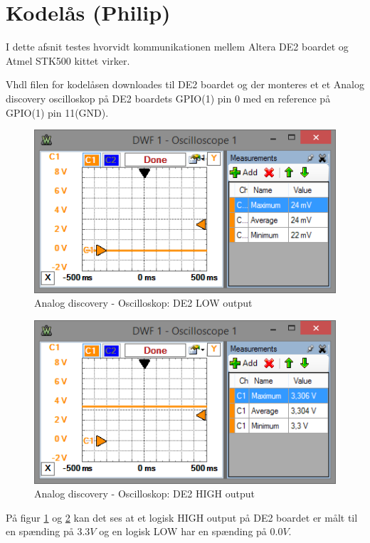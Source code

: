 \section{Kodelås (Philip)} \label{sec:Kodelaas}

I dette afsnit testes hvorvidt kommunikationen mellem Altera DE2 boardet og Atmel STK500 kittet virker.

Vhdl filen for kodelåsen \cite{lib:Codelock} downloades til DE2 boardet og der monteres et et Analog discovery oscilloskop på DE2 boardets GPIO(1) pin 0 med en reference på GPIO(1) pin 11(GND).

\begin{figure}[h]
	\centering
	\includegraphics[scale=1, trim=0 0 0 0, clip=true]{../Implementering/billeder/DE2LOW.png}
	\caption{Analog discovery - Oscilloskop: DE2 LOW output}
	\label{fig:DE2LOW}
\end{figure}

\begin{figure}[h]
	\centering
	\includegraphics[scale=1, trim=0 0 0 0, clip=true]{../Implementering/billeder/DE2HIGH.png}
	\caption{Analog discovery - Oscilloskop: DE2 HIGH output}
	\label{fig:DE2HIGH}
\end{figure}

På figur \ref{fig:DE2LOW} og \ref{fig:DE2HIGH} kan det ses at et logisk HIGH output på DE2 boardet er målt til en spænding på $3.3V$ og en logisk LOW har en spænding på $0.0V$.

